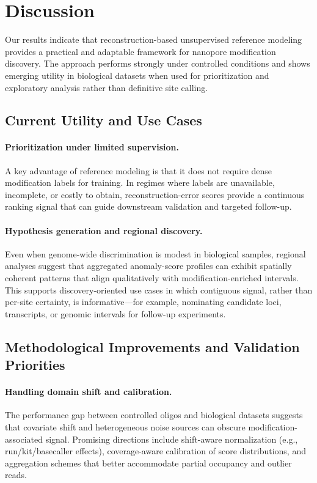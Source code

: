 \documentclass[sigconf, review]{acmart}
\begin{document}
\section{Discussion}
Our results indicate that reconstruction-based unsupervised reference modeling provides a practical and adaptable framework for nanopore modification discovery. The approach performs strongly under controlled conditions and shows emerging utility in biological datasets when used for prioritization and exploratory analysis rather than definitive site calling.

\subsection{Current Utility and Use Cases}
\paragraph{Prioritization under limited supervision.}
A key advantage of reference modeling is that it does not require dense modification labels for training. In regimes where labels are unavailable, incomplete, or costly to obtain, reconstruction-error scores provide a continuous ranking signal that can guide downstream validation and targeted follow-up.

\paragraph{Hypothesis generation and regional discovery.}
Even when genome-wide discrimination is modest in biological samples, regional analyses suggest that aggregated anomaly-score profiles can exhibit spatially coherent patterns that align qualitatively with modification-enriched intervals. This supports discovery-oriented use cases in which contiguous signal, rather than per-site certainty, is informative—for example, nominating candidate loci, transcripts, or genomic intervals for follow-up experiments.

\subsection{Methodological Improvements and Validation Priorities}
\paragraph{Handling domain shift and calibration.}
The performance gap between controlled oligos and biological datasets suggests that covariate shift and heterogeneous noise sources can obscure modification-associated signal. Promising directions include shift-aware normalization (e.g., run/kit/basecaller effects), coverage-aware calibration of score distributions, and aggregation schemes that better accommodate partial occupancy and outlier reads.
\end{document}
